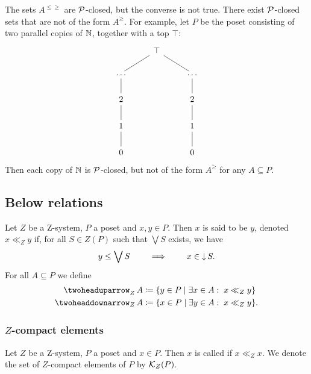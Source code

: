 \begin{example}
The sets $A^{\leq\geq}$ are $\operatorname{\mathcal{P}}$-closed, but the converse is not true. There exist $\operatorname{\mathcal{P}}$-closed sets that are not of the form $A^\geq$. For example, let $P$ be the poset consisting of two parallel copies of $\mathbb{N}$, together with a top $\top$:
\[ \begin{tikzcd}
{} & \top \ar[dl, dash] \ar[dr, dash] & {} \\
\hdots \ar[d,dash] & {} & \hdots \ar[d,dash] \\
2 \ar[d,dash] & {} & 2 \ar[d,dash] \\
1 \ar[d,dash] & {} & 1 \ar[d,dash] \\
0 & {} & 0
\end{tikzcd} \]
Then each copy of $\mathbb{N}$ is $\operatorname{\mathcal{P}}$-closed, but not of the form $A^\geq$ for any $A\subseteq P$.
\end{example}


\subsection{Below relations}
\begin{definition}
Let $Z$ be a $\mathrm{Z}$-system, $P$ a poset and $x,y\in P$. Then $x$ is said to be  $y$, denoted $x \ll_Z y$ if, for all $S\in Z(P)$ such that $\bigvee S$ exists, we have
\[ y \leq \bigvee S \qquad \implies \qquad x \in \operatorname{\downarrow} S. \]
For all $A\subseteq P$ we define
\begin{align*}
\uupset_Z A &\defeq \setbuilder{y\in P}{\exists x\in A: \; x \ll_Z y} \\
\ddownset_Z A &\defeq \setbuilder{x\in P}{\exists y\in A: \; x \ll_Z y}.
\end{align*}
\end{definition}

\subsubsection{$Z$-compact elements}
\begin{definition}
Let $Z$ be a $\mathrm{Z}$-system, $P$ a poset and $x\in P$. Then $x$ is called  if $x \ll_Z x$. We denote the set of $Z$-compact elements of $P$ by $\operatorname{\mathcal{K}}_Z(P)$.
\end{definition}

